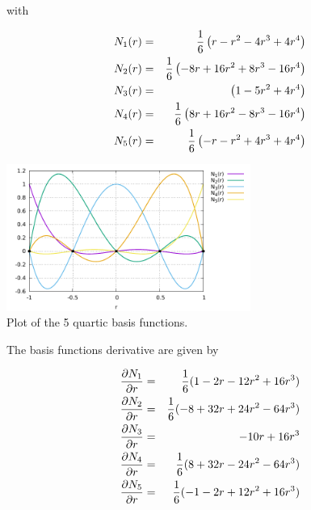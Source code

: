 with 
\begin{mdframed}[backgroundcolor=blue!5]
\begin{eqnarray}
N_1(r)&=& \frac{1}{6} \left(  r- r^2 -4r^3 +4r^4\right) \nonumber\\
N_2(r)&=& \frac{1}{6} \left(  -8r+16 r^2 +8r^3 -16 r^4\right)  \nonumber\\
N_3(r)&=& \left( 1 -5r^2+4r^4  \right) \nonumber \\
N_4(r)&=& \frac{1}{6} \left(  8r+16 r^2 -8r^3 -16 r^4\right)  \nonumber\\
N_5(r)&=& \frac{1}{6} \left(  -r- r^2 +4r^3 +4r^4\right) 
\end{eqnarray}
\end{mdframed}

\begin{center}
\includegraphics[width=8cm]{images/basis1D/quartic.pdf}\\
{\captionfont Plot of the 5 quartic basis functions.}
\end{center}

The basis functions derivative are given by
\begin{mdframed}[backgroundcolor=blue!5]
\begin{eqnarray}
\frac{\partial N_1}{\partial r}&=& \frac{1}{6}(1-2r-12r^2+16r^3) \nonumber\\
\frac{\partial N_2}{\partial r}&=& \frac{1}{6}(-8+32r+24r^2-64r^3) \nonumber\\
\frac{\partial N_3}{\partial r}&=& -10r+16r^3 \nonumber\\
\frac{\partial N_4}{\partial r}&=& \frac{1}{6} (8+32r-24r^2-64r^3) \nonumber\\
\frac{\partial N_5}{\partial r}&=& \frac{1}{6} (-1-2r+12r^2+16r^3) 
\end{eqnarray}
\end{mdframed}

